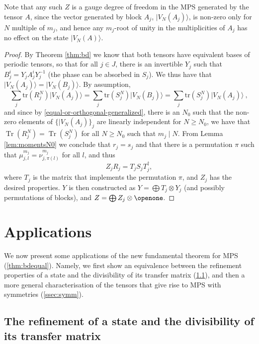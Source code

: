 \documentclass[pra,a4paper,notitlepage,nofootinbib,superscriptaddress]{revtex4-1}
\theoremstyle{plain}
\newcommand{\1}{{\openone}}
\newcommand{\ra}{\rangle}
\DeclareMathOperator{\tr}{Tr}
\begin{document}
Note that any such $Z$ is a gauge degree of freedom in the MPS generated
by the tensor $A$, since the vector generated by block $A_j$,
$|V_N(A_j)\ra$, is non-zero only for $N$ multiple of $m_j$, and hence any
$m_j$-root of unity in the multiplicities of $A_j$ has no effect on the
state $|V_N(A)\ra$.


\begin{proof}
    By Theorem \ref{thm:bd} we know that  both tensors have equivalent  bases
    of periodic tensors, so that for all $j\in J$,  there is an invertible
    $Y_j$ such that $B^i_j = Y_j A^i_{j} Y_j^{-1}$ (the phase can be absorbed
    in $S_j$).  We thus have that $\vert V_N(A_j)\rangle = \vert
        V_N(B_j)\rangle$. By assumption,
    \[
        \sum_j \mathrm{tr}(R_j^N) \vert V_N(A_j)\rangle =
        \sum_j \mathrm{tr}(S_j^N) \vert V_N(B_j)\rangle =
        \sum_j \mathrm{tr}(S_j^N) \vert V_N(A_j)\rangle\ ,
    \]
    and since by \cref{equal-or-orthogonal-generalized}, there is an $N_0$
    such that the non-zero elements of $\{\vert V_N(A_j)\}_j$ are linearly
    independent for $N\ge N_0$, we have that $\tr\left(R_j^N\right)=
        \tr\left(S_j^N\right)$ for all $N\geq N_0$  such that $m_j \mid N$.
    From Lemma \ref{lem:momentsN0}  we conclude that $r_j=s_j$ and that there
    is a permutation $\pi$ such that $\mu_{j,l}^{m_j} = \nu_{j,\pi(l)}^{m_j}$
    for all $l$, and thus
    $$
        Z_j R_j =  T_j S_j T_j^\dagger,
    $$
    where $T_j$ is the matrix that implements the permutation $\pi$,
    and $Z_j$ has the desired properties.
    $Y$ is then constructed as $Y=\bigoplus T_j\otimes Y_j$ (and possibly permutations
    of blocks), and $Z=\bigoplus Z_j\otimes \openone$.
\end{proof}


\section{Applications}
\label{sec:appl}

We now present some applications of the new fundamental theorem for MPS (\cref{thm:bdequal}).
Namely, we first show an equivalence between the refinement properties of a state and the divisibility of its transfer matrix (\cref{ssec:div}),
and then a more general characterisation of the tensors that give rise to MPS with symmetries (\cref{ssec:symm}).



\subsection{The refinement of a state and the divisibility of its transfer matrix}
\label{ssec:div}
\end{document}
